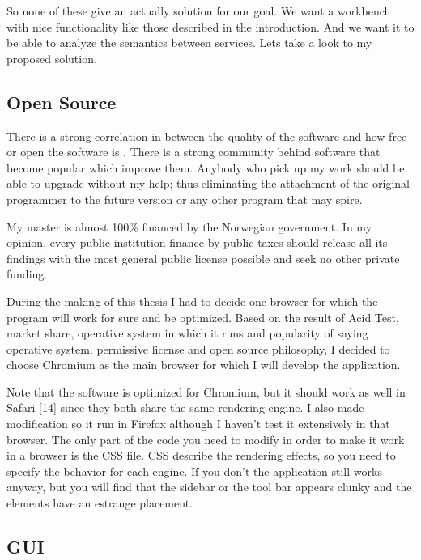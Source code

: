 \documentclass[a4paper,10pt]{article}
\begin{document}
  So none of these give an actually solution for our goal. We want a workbench with nice functionality like those described in the introduction. And we want it to be able to analyze the semantics between services. Lets take a look to my proposed solution.



  \subsection{Open Source}

  There is a strong correlation in between the quality of the software and how free or open the software is \cite{opensource01} \cite{conf/ecis/BarbagalloF09} \cite{10.1109/TSE.2008.68}. There is a strong community behind software that become popular which improve them. Anybody who pick up my work should be able to upgrade without my help; thus eliminating the attachment of the original programmer to the future version or any other program that may spire.\vspace{3 mm}

  My master is almost 100\% financed by the Norwegian government. In my opinion, every public institution finance by public taxes should release all its findings with the most general public license possible and seek no other private funding.\vspace{3 mm}

  During the making of this thesis I had to decide one browser for which the program will work for sure and be optimized. Based on the result of Acid Test, market share, operative system in which it runs and popularity of saying operative system, permissive license and open source philosophy, I decided to choose Chromium as the main browser for which I will develop the application.\vspace{3 mm}

  Note that the software is optimized for Chromium, but it should work as well in Safari [14] since they both share the same rendering engine. I also made modification so it run in Firefox although I haven't test it extensively in that browser. The only part of the code you need to modify in order to make it work in a browser is the CSS file. CSS describe the rendering effects, so you need to specify the behavior for each engine. If you don't the application still works anyway, but you will find that the sidebar or the tool bar appears clunky and the elements have an estrange placement.

  \subsection{GUI}
\end{document}

